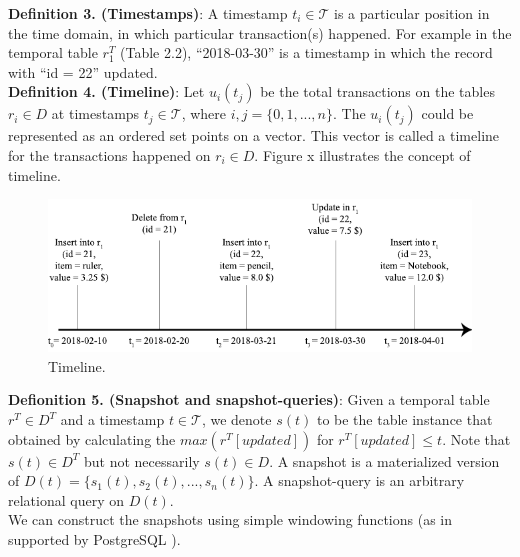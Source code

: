\textbf{Definition 3. (Timestamps)}: A timestamp $t_i \in \mathcal{T}$ is a particular position in the time domain, in which particular transaction(s) happened. For example in the temporal table $r_1^T$ (Table 2.2), ``2018-03-30'' is a timestamp in which the record with ``id = 22'' updated. \\

\textbf{Definition 4. (Timeline)}: Let $u_i(t_j)$ be the total transactions on the tables $r_i \in D$ at timestamps $t_j \in \mathcal{T}$, where $i,j=\{0,1,...,n\}$. The $u_i(t_j)$ could be represented as an ordered set points on a vector. This vector is called a timeline for the transactions happened on $r_i \in D$. Figure x illustrates the concept of timeline.\\
\begin{figure}[H]
	\label{fig:timeline}
	\centering
	\includegraphics[width=\textwidth]{figs/timeline.pdf}
	\caption{Timeline.}
\end{figure}

\textbf{Defionition 5. (Snapshot and snapshot-queries)}: Given a temporal table $r^T \in D^T$ and a timestamp $t \in \mathcal{T}$, we denote $s(t)$ to be the table instance that obtained by calculating the $max(r^T[updated])$ for $r^T[updated]\leq t$. Note that $s(t) \in D^T$ but not necessarily $s(t) \in D$. A snapshot is a materialized version of $D(t) = \{s_1(t),s_2(t),...,s_n(t)\}$. A snapshot-query is an arbitrary relational query on $D(t)$.\\

We can construct the snapshots using simple windowing functions (as in supported
by PostgreSQL \cite{momjian2001postgresql}).

